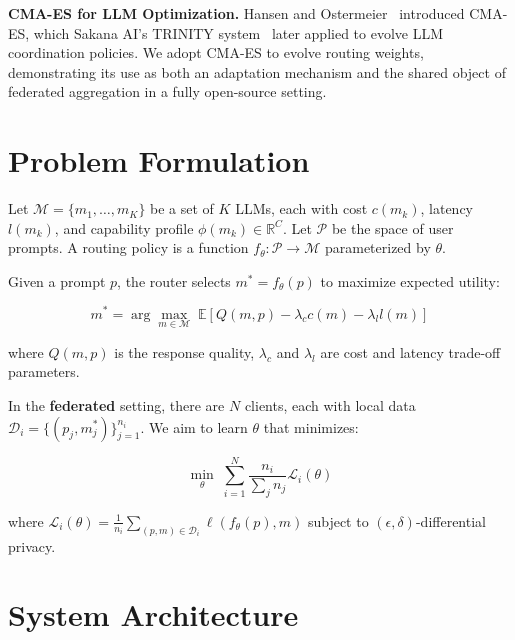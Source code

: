 \documentclass[11pt,a4paper]{article}
\newcommand{\dataset}{\mathcal{D}}
\newcommand{\modelspace}{\mathcal{M}}
\newcommand{\promptspace}{\mathcal{P}}
\newcommand{\loss}{\mathcal{L}}
\begin{document}
\textbf{CMA-ES for LLM Optimization.}
Hansen and Ostermeier~\cite{hansen2001} introduced CMA-ES, which Sakana AI's TRINITY system~\cite{trinity2025} later applied to evolve LLM coordination policies.
We adopt CMA-ES to evolve routing weights, demonstrating its use as both an adaptation mechanism and the shared object of federated aggregation in a fully open-source setting.

\section{Problem Formulation}

Let $\modelspace = \{m_1, \dots, m_K\}$ be a set of $K$ LLMs, each with cost $c(m_k)$, latency $l(m_k)$, and capability profile $\phi(m_k) \in \mathbb{R}^C$.
Let $\promptspace$ be the space of user prompts.
A routing policy is a function $f_\theta: \promptspace \rightarrow \modelspace$ parameterized by $\theta$.

Given a prompt $p$, the router selects $m^* = f_\theta(p)$ to maximize expected utility:

\begin{equation}
    m^* = \arg\max_{m \in \modelspace} \; \mathbb{E}\left[Q(m, p) - \lambda_c c(m) - \lambda_l l(m)\right]
    \label{eq:objective}
\end{equation}

where $Q(m, p)$ is the response quality, $\lambda_c$ and $\lambda_l$ are cost and latency trade-off parameters.

In the \textbf{federated} setting, there are $N$ clients, each with local data $\dataset_i = \{(p_j, m_j^*)\}_{j=1}^{n_i}$.
We aim to learn $\theta$ that minimizes:

\begin{equation}
    \min_\theta \; \sum_{i=1}^N \frac{n_i}{\sum_j n_j} \loss_i(\theta)
    \label{eq:federated}
\end{equation}

where $\loss_i(\theta) = \frac{1}{n_i} \sum_{(p,m) \in \dataset_i} \ell(f_\theta(p), m)$ subject to $(\epsilon, \delta)$-differential privacy.

\section{System Architecture}
\end{document}
